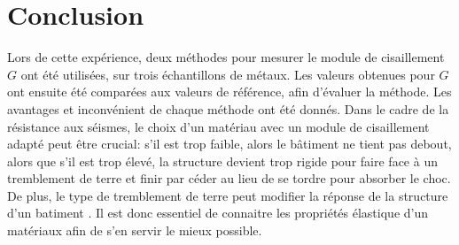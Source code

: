 \section{Conclusion}

Lors de cette expérience, deux méthodes pour mesurer le module de cisaillement $G$ ont été utilisées, sur trois échantillons de métaux. Les valeurs obtenues pour $G$ ont ensuite été comparées aux valeurs de référence, afin d'évaluer la méthode. Les avantages et inconvénient de chaque méthode ont été donnés. Dans le cadre de la résistance aux séismes, le choix d'un matériau avec un module de cisaillement adapté peut être crucial: s'il est trop faible, alors le bâtiment ne tient pas debout, alors que s'il est trop élevé, la structure devient trop rigide pour faire face à un tremblement de terre et finir par céder au lieu de se tordre pour absorber le choc. De plus, le type de tremblement de terre peut modifier la réponse de la structure d'un batiment \cite{japan_shaky_stiffness}. Il est donc essentiel de connaitre les propriétés élastique d'un matériaux afin de s'en servir le mieux possible.